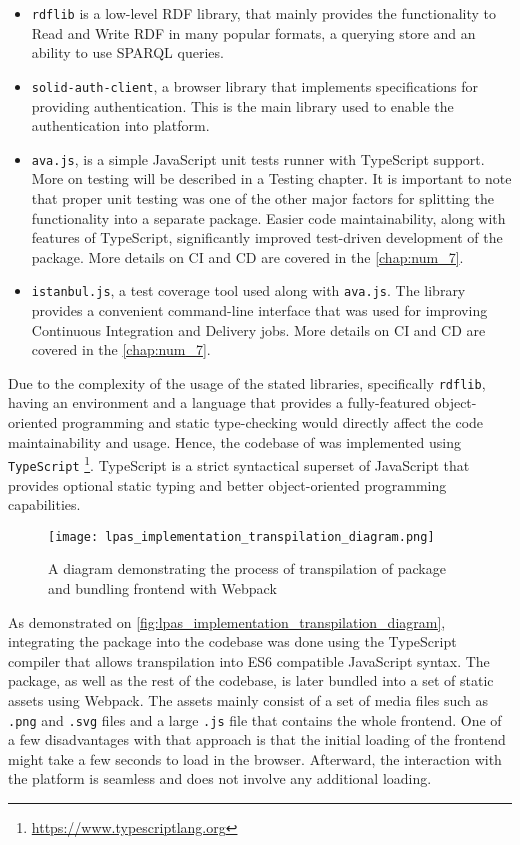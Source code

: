 \begin{itemize}
    \item \texttt{rdflib} is a low-level RDF library, that mainly provides the functionality to Read and Write RDF in many popular formats, a querying store and an ability to use SPARQL queries.
    \item \texttt{solid-auth-client}, a browser library that implements \solid{} specifications for providing authentication. This is the main library used to enable the authentication into \lpa{} platform. 
    \item \texttt{ava.js}, is a simple JavaScript unit tests runner with TypeScript support. More on testing will be described in a Testing chapter. It is important to note that proper unit testing was one of the other major factors for splitting the \solid{} functionality into a separate package. Easier code maintainability, along with features of TypeScript, significantly improved test-driven development of the package. More details on CI and CD are covered in the \autoref{chap:num_7}.
    \item \texttt{istanbul.js}, a test coverage tool used along with \texttt{ava.js}. The library provides a convenient command-line interface that was used for improving Continuous Integration and Delivery jobs. More details on CI and CD are covered in the \autoref{chap:num_7}.
\end{itemize}

Due to the complexity of the usage of the stated libraries, specifically \texttt{rdflib}, having an environment and a language that provides a fully-featured object-oriented programming and static type-checking would directly affect the code maintainability and usage. Hence, the codebase of \lpas{} was implemented using \texttt{TypeScript} \footnote{\url{https://www.typescriptlang.org}}. TypeScript is a strict syntactical superset of JavaScript that provides optional static typing and better object-oriented programming capabilities.  

\begin{figure}[h]
\centering
\texttt{[image: lpas\_implementation\_transpilation\_diagram.png]}
\caption{A diagram demonstrating the process of transpilation of \lpas{} package and bundling \lpa{} frontend with Webpack}
\label{fig:lpas_implementation_transpilation_diagram}
\end{figure}

As demonstrated on \autoref{fig:lpas_implementation_transpilation_diagram}, integrating the package into the \lpa{} codebase was done using the TypeScript compiler that allows transpilation into ES6 compatible JavaScript syntax. The package, as well as the rest of the \lpa{} codebase,  is later bundled into a set of static assets using Webpack. The assets mainly consist of a set of media files such as \texttt{.png} and \texttt{.svg} files and a large \texttt{.js} file that contains the whole \lpa{} frontend. One of a few disadvantages with that approach is that the initial loading of the frontend might take a few seconds to load in the browser. Afterward, the interaction with the platform is seamless and does not involve any additional loading.

